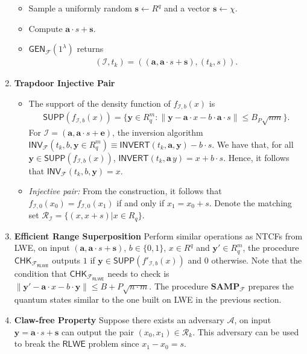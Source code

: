 \documentclass[cryptography,review,submit,pdftex,moreauthors,amsmath,amssymb,aps,strict]{Definitions/mdpi}
\begin{document}
\begin{Definition}
\begin{enumerate}
\begin{itemize}
        \item Sample a uniformly random $\mathbf{s}\gets R^q$ and a vector $\mathbf{s}\gets \chi$.
        \item Compute $\mathbf{a}\cdot s+\mathbf{s}$.
        \item $\mathsf{GEN}_{\mathcal{F}}(1^{\lambda})$ returns \begin{align}
            (\mathcal{I},t_k)=((\mathbf{a},\mathbf{a}\cdot s+\mathbf{s}),(t_{k},s)).
        \end{align}
        \end{itemize}
    \item \textbf{Trapdoor Injective Pair}
        \begin{itemize}
        \item The support of the density function of $f_{\mathcal{I},b}(x)$ is 
        \begin{align}
            \mathsf{SUPP}(f_{\mathcal{I},b}(x))=\{\mathbf{y}\in R_q^m:\|\mathbf{y}- \mathbf{a} \cdot x-b\cdot \mathbf{a} \cdot s\|\leq B_P\sqrt{nm}\}.
        \end{align}
        For $\mathcal{I}=(\mathbf{a},\mathbf{a}\cdot s+\mathbf{e})$, the inversion algorithm $\mathsf{INV}_\mathcal{F}(t_{k},b,\mathbf{y}\in R_q^m) \equiv \mathsf{INVERT}(t_{k},\mathbf{a},\mathbf{y})-b\cdot s$. We have that, for all $\mathbf{y}\in \mathsf{SUPP}(f_{\mathcal{I},b}(x))$, $\mathsf{INVERT}(t_{k},\mathbf{a}\,y)=x+b\cdot s$. Hence, it follows that $\mathsf{INV}_\mathcal{F}(t_{k},b,\mathbf{y})= x$.
        
        \item \textit{Injective pair:} From the construction, it follows that $f_{\mathcal{I},0}(x_0)= f_{\mathcal{I},0}(x_1)$ if and only if $x_1=x_0+s$. Denote the matching set $\mathcal{R}_{\mathcal{I}}=\{(x,x+s)|x\in R_q\}$.
    \end{itemize}
    \item \textbf{Efficient Range Superposition}
    Perform similar operations as NTCFs from LWE, on input $(\mathbf{a},\mathbf{a}\cdot s+\mathbf{s})$, $b\in\{0,1\}$, $x\in R^q$ and $\mathbf{y}'\in R^m_q$, the procedure $\mathsf{CHK}_{\mathcal{F}_{\mathsf{RLWE}}}$ outputs $1$ if $\mathbf{y}\in\mathsf{SUPP}(f'_{\mathcal{I},b}(x))$ and $0$ otherwise.
    Note that the condition that $\mathsf{CHK}_{\mathcal{F}_{\mathsf{RLWE}}}$ needs to check is $\|\mathbf{y}'-\mathbf{a}\cdot x - b\cdot \mathbf{y}\|\leq B+P\sqrt{n\cdot m}$.
    The procedure $\mathbf{SAMP}_{\mathcal{F}}$ prepares the quantum states similar to the one built on LWE in the previous section.
     
    \item \textbf{Claw-free Property} Suppose there exists an adversary $\mathcal{A}$, on input $\mathbf{y}=\mathbf{a}\cdot s+\mathbf{s}$ can output the pair $(x_0,x_1)\in\mathcal{R}_k$. This adversary can be used to break the $\mathsf{RLWE}$ problem since $x_1-x_0=s$.  
        
    \end{enumerate}
\end{Definition}
\end{document}
